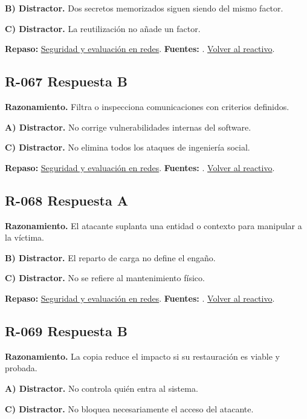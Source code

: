 \textbf{B) Distractor. }Dos secretos memorizados siguen siendo del mismo factor.

\textbf{C) Distractor. }La reutilización no añade un factor.

\textbf{Repaso:} \hyperref[sec:r3]{Seguridad y evaluación en redes}. \textbf{Fuentes:} \cite{nistsecurity,owasp,aes,tls}. \hyperref[q:R-066]{Volver al reactivo}.\par\medskip

\subsection*{R-067 \quad Respuesta B}\label{s:R-067}
\textbf{Razonamiento.} Filtra o inspecciona comunicaciones con criterios definidos.

\textbf{A) Distractor. }No corrige vulnerabilidades internas del software.

\textbf{C) Distractor. }No elimina todos los ataques de ingeniería social.

\textbf{Repaso:} \hyperref[sec:r3]{Seguridad y evaluación en redes}. \textbf{Fuentes:} \cite{nistsecurity,owasp,aes,tls}. \hyperref[q:R-067]{Volver al reactivo}.\par\medskip

\subsection*{R-068 \quad Respuesta A}\label{s:R-068}
\textbf{Razonamiento.} El atacante suplanta una entidad o contexto para manipular a la víctima.

\textbf{B) Distractor. }El reparto de carga no define el engaño.

\textbf{C) Distractor. }No se refiere al mantenimiento físico.

\textbf{Repaso:} \hyperref[sec:r3]{Seguridad y evaluación en redes}. \textbf{Fuentes:} \cite{nistsecurity,owasp,aes,tls}. \hyperref[q:R-068]{Volver al reactivo}.\par\medskip

\subsection*{R-069 \quad Respuesta B}\label{s:R-069}
\textbf{Razonamiento.} La copia reduce el impacto si su restauración es viable y probada.

\textbf{A) Distractor. }No controla quién entra al sistema.

\textbf{C) Distractor. }No bloquea necesariamente el acceso del atacante.


